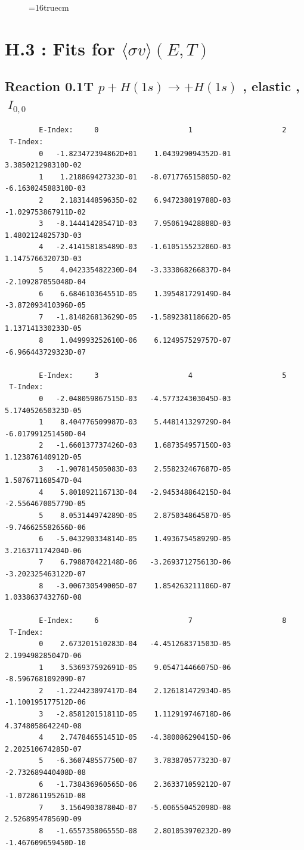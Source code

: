 \documentclass[12pt,dvips]{article}
\begin{document}
\begin{figure} \label{2.26B}
\epsfxsize=16truecm
\end{figure}
\newpage

\section{H.3 : Fits for $\langle\sigma v \rangle (E,T)$}\label{sect3}


\subsection{
Reaction 0.1T  $p + H(1s) \rightarrow  + H(1s)$
, elastic ,
$\  I_{0,0}$
}




\begin{small}\begin{verbatim}
        E-Index:     0                     1                     2
 T-Index:
        0   -1.823472394862D+01    1.043929094352D-01    3.385021298310D-02
        1    1.218869427323D-01   -8.071776515805D-02   -6.163024588310D-03
        2    2.183144859635D-02    6.947238019788D-03   -1.029753867911D-02
        3   -8.144414285471D-03    7.950619428888D-03    1.480212482573D-03
        4   -2.414158185489D-03   -1.610515523206D-03    1.147576632073D-03
        5    4.042335482230D-04   -3.333068266837D-04   -2.109287055048D-04
        6    6.684610364551D-05    1.395481729149D-04   -3.872093410396D-05
        7   -1.814826813629D-05   -1.589238118662D-05    1.137141330233D-05
        8    1.049993252610D-06    6.124957529757D-07   -6.966443729323D-07

        E-Index:     3                     4                     5
 T-Index:
        0   -2.048059867515D-03   -4.577324303045D-03    5.174052650323D-05
        1    8.404776509987D-03    5.448141329729D-04   -6.017991251450D-04
        2   -1.660137737426D-03    1.687354957150D-03    1.123876140912D-05
        3   -1.907814505083D-03    2.558232467687D-05    1.587671168547D-04
        4    5.801892116713D-04   -2.945348864215D-04   -2.556467005779D-05
        5    8.053144974289D-05    2.875034864587D-05   -9.746625582656D-06
        6   -5.043290334814D-05    1.493675458929D-05    3.216371174204D-06
        7    6.798870422148D-06   -3.269371275613D-06   -3.202325463122D-07
        8   -3.006730549005D-07    1.854263211106D-07    1.033863743276D-08

        E-Index:     6                     7                     8
 T-Index:
        0    2.673201510283D-04   -4.451268371503D-05    2.199498285047D-06
        1    3.536937592691D-05    9.054714466075D-06   -8.596768109209D-07
        2   -1.224423097417D-04    2.126181472934D-05   -1.100195177512D-06
        3   -2.858120151811D-05    1.112919746718D-06    4.374805864224D-08
        4    2.747846551451D-05   -4.380086290415D-06    2.202510674285D-07
        5   -6.360748557750D-07    3.783870577323D-07   -2.732689440408D-08
        6   -1.738436960565D-06    2.363371059212D-07   -1.072861195261D-08
        7    3.156490387804D-07   -5.006550452098D-08    2.526895478569D-09
        8   -1.655735806555D-08    2.801053970232D-09   -1.467609659450D-10


\end{verbatim}
\end{small}
\end{document}
